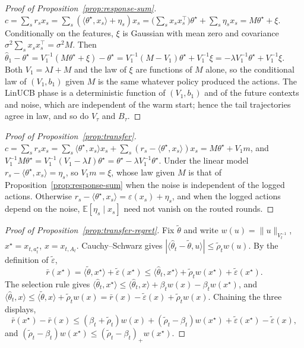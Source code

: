 \documentclass{article}
\theoremstyle{definition}
\theoremstyle{remark}
\newcommand{\E}{\mathbb{E}}
\theoremstyle{remark}
\newcommand{\wid}{w}
\begin{document}
\begin{proof}[Proof of Proposition~\ref{prop:response-sum}]
$c=\sum_sr_sx_s=\sum_s(\langle\theta^\star,x_s\rangle+\eta_s)x_s
=\bigl(\sum_sx_sx_s^\top\bigr)\theta^\star+\sum_s\eta_sx_s=M\theta^\star+\xi$.
Conditionally on the features, $\xi$ is Gaussian with mean zero and covariance
$\sigma^2\sum_sx_sx_s^\top=\sigma^2M$. Then
$\widehat\theta_1-\theta^\star=V_1^{-1}(M\theta^\star+\xi)-\theta^\star
=V_1^{-1}(M-V_1)\theta^\star+V_1^{-1}\xi=-\lambda V_1^{-1}\theta^\star+V_1^{-1}\xi$.
Both $V_1=\lambda I+M$ and the law of $\xi$ are functions of $M$ alone, so the
conditional law of $(V_1,b_1)$ given $M$ is the same whatever policy produced
the actions. The LinUCB phase is a deterministic function of $(V_1,b_1)$ and of
the future contexts and noise, which are independent of the warm start; hence
the tail trajectories agree in law, and so do $V_\tau$ and $B_\tau$.
\end{proof}

\begin{proof}[Proof of Proposition~\ref{prop:transfer}]
$c=\sum_sr_sx_s=\sum_s\langle\theta^\star,x_s\rangle x_s+\sum_s(r_s-\langle\theta^\star,x_s\rangle)x_s
=M\theta^\star+V_1m$, and
$V_1^{-1}M\theta^\star=V_1^{-1}(V_1-\lambda I)\theta^\star=\theta^\star-\lambda V_1^{-1}\theta^\star$.
Under the linear model $r_s-\langle\theta^\star,x_s\rangle=\eta_s$, so
$V_1m=\xi$, whose law given $M$ is that of
Proposition~\ref{prop:response-sum} when the noise is independent of the
logged actions. Otherwise $r_s-\langle\theta^\star,x_s\rangle=\varepsilon(x_s)+\eta_s$,
and when the logged actions depend on the noise, $\E[\eta_s\mid x_s]$ need
not vanish on the routed rounds.
\end{proof}

\begin{proof}[Proof of Proposition~\ref{prop:transfer-regret}]
Fix $\widetilde\theta$ and write $\wid(u)=\|u\|_{V_t^{-1}}$,
$x^\star=x_{t,a^\star_t}$, $x=x_{t,A_t}$. Cauchy--Schwarz gives
$|\langle\widehat\theta_t-\widetilde\theta,u\rangle|\le\widetilde\rho_t\wid(u)$.
By the definition of $\widetilde\varepsilon$,
\[
\bar r(x^\star)=\langle\widetilde\theta,x^\star\rangle+\widetilde\varepsilon(x^\star)
\le\langle\widehat\theta_t,x^\star\rangle+\widetilde\rho_t\wid(x^\star)+\widetilde\varepsilon(x^\star).
\]
The selection rule gives
$\langle\widehat\theta_t,x^\star\rangle\le\langle\widehat\theta_t,x\rangle+\beta_t\wid(x)-\beta_t\wid(x^\star)$,
and
$\langle\widehat\theta_t,x\rangle\le\langle\widetilde\theta,x\rangle+\widetilde\rho_t\wid(x)
=\bar r(x)-\widetilde\varepsilon(x)+\widetilde\rho_t\wid(x)$.
Chaining the three displays,
\[
\bar r(x^\star)-\bar r(x)\le(\beta_t+\widetilde\rho_t)\wid(x)
+(\widetilde\rho_t-\beta_t)\wid(x^\star)
+\widetilde\varepsilon(x^\star)-\widetilde\varepsilon(x),
\]
and $(\widetilde\rho_t-\beta_t)\wid(x^\star)\le(\widetilde\rho_t-\beta_t)_+\wid(x^\star)$.
\end{proof}
\end{document}
